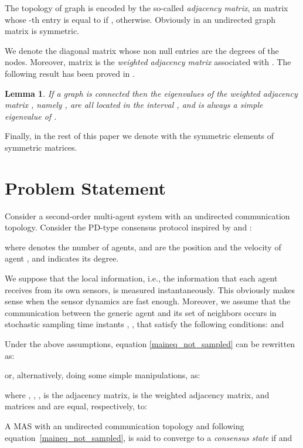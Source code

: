 \documentclass[conference]{IEEEtran}
\newtheorem{lemma}[theorem]{\textbf{Lemma}}
\begin{document}
The topology of graph  is encoded by the so-called {\em adjacency matrix}, an  matrix  whose -th entry is equal to  if ,  otherwise. Obviously in an undirected graph matrix  is symmetric.

We denote  the diagonal matrix whose non null entries are the degrees of the nodes. Moreover, matrix  is the {\em weighted adjacency matrix} associated with .
The following result has been proved in \cite{ETFA2014}.

\begin{lemma}\label{lemma_connected}
If a graph  is connected then the eigenvalues of the weighted adjacency matrix , namely , are all located in the interval , and  is always a simple eigenvalue of .
\end{lemma}



Finally, in the rest of this paper we denote with  the symmetric elements of symmetric matrices.


\section{Problem Statement}\label{ProblemState}

Consider a second-order multi-agent system with an undirected communication topology. Consider the PD-type consensus protocol inspired by  \cite{cepeda2011exact} and \cite{Zareh_consensus}:

where  denotes the number of agents,  and  are the position and the velocity of agent , and  indicates its degree.



We suppose that the local information, i.e., the information that each agent receives from its own sensors, is measured instantaneously. This obviously makes sense when the sensor dynamics are fast enough. 
Moreover, we assume that the communication between the generic agent  and its set of neighbors  occurs in stochastic sampling time instants , , that satisfy the following conditions:  and 

Under the above assumptions, equation \eqref{maineq_not_sampled} can be rewritten as:

or, alternatively, doing some simple manipulations, as:

where , , ,  is the adjacency matrix,  is the weighted adjacency matrix, and matrices  and  are equal, respectively, to:



A MAS with an undirected communication topology and following equation~\eqref{maineq_not_sampled}, is said to converge to a \emph{consensus state} if  and 
\end{document}
